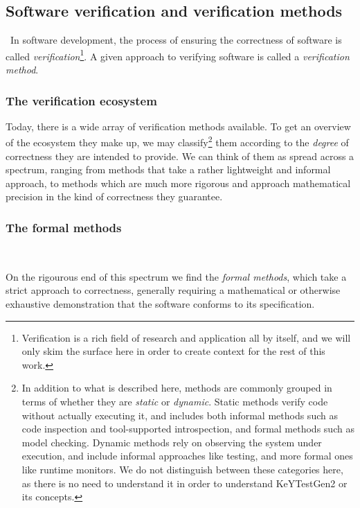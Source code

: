 \documentclass{article}
\newcommand{\tmem}[1]{{\em #1\/}}
\begin{document}
\subsection{Software verification and verification methods}

\ In software development, the process of ensuring the correctness of
software is called {\tmem{verification}}{\footnote{Verification is a rich
field of research and application all by itself, and we will only skim the
surface here in order to create context for the rest of this work.}}. A given
approach to verifying software is called a {\tmem{verification method}}.



\subsubsection{The verification ecosystem}

Today, there is a wide array of verification methods available. To get an
overview of the ecosystem they make up, we may classify{\footnote{In addition
to what is described here, methods are commonly grouped in terms of whether
they are {\tmem{static}} or {\tmem{dynamic}}. Static methods verify code
without actually executing it, and includes both informal methods such as code
inspection and tool-supported introspection, and formal methods such as model
checking. Dynamic methods rely on observing the system under execution, and
include informal approaches like testing, and more formal ones like runtime
monitors. We do not distinguish between these categories here, as there is no
need to understand it in order to understand KeYTestGen2 or its concepts.}}
them according to the {\tmem{degree}} {\tmem{}}of correctness they are
intended to provide. We can think of them as spread across a spectrum, ranging
from methods that take a rather lightweight and informal approach, to methods
which are much more rigorous and approach mathematical precision in the kind
of correctness they guarantee.



\subsubsection{The formal methods} \

On the rigourous end of this spectrum we find the {\tmem{formal methods}},
which take a strict approach to correctness, generally requiring a
mathematical or otherwise exhaustive demonstration that the software conforms
to its specification.
\end{document}
